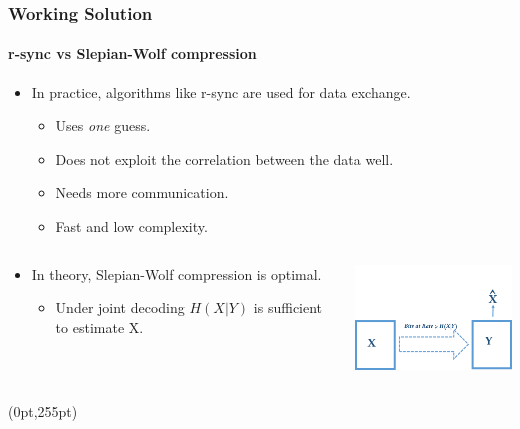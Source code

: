 \documentclass[xcolor=dvipsnames]{beamer}
\newcommand\hypercorner[1]{%
  \begin{textblock*}{\paperwidth}(0pt,255pt)
    \raggedleft #1\hspace{.5em}
  \end{textblock*}}
\begin{document}
\begin{frame}[label= rsynccomp]
\frametitle{Working Solution}
\framesubtitle{r-sync vs Slepian-Wolf compression}
\begin{itemize}
\item In practice, algorithms like r-sync are used for data exchange.
\begin{itemize}
\item Uses \emph{one} guess.
\item Does not exploit the correlation between the data well.
\item Needs more communication.
\item Fast and low complexity.
\end{itemize}
\end{itemize}
\begin{minipage}[0.5\textheight]{\textwidth}
\begin{columns}
\begin{column}{0.4\textwidth}
\begin{itemize}
\item In theory, Slepian-Wolf compression is optimal. 
\begin{itemize}
\item Under joint decoding $H(X|Y)$ is sufficient to estimate X.
\end{itemize}
\end{itemize}
\end{column}
\begin{column}{0.5\textwidth}
\includegraphics[width=5.2cm]{./swcompp.png}
\end{column}
\end{columns}
\end{minipage}
\hypercorner{\hyperlink{rsync}{}}
\end{frame}
\end{document}
